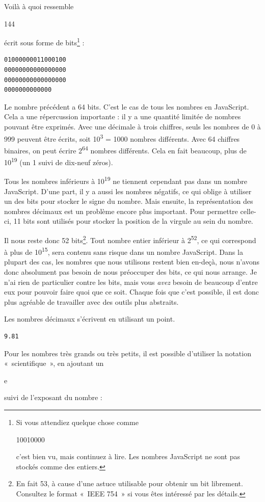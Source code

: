 \documentclass{FramateX}
\renewcommand{\texttt}[1]{\begin{sffamily}{#1}\end{sffamily}}
\begin{document}
Voilà à quoi ressemble \texttt{144} écrit sous forme de
bits\footnote{Si vous attendiez quelque chose comme \texttt{10010000} c'est bien vu, mais continuez à lire. Les nombres JavaScript ne sont pas stockés comme des entiers.} :

\begin{lstlisting}
01000000011000100
00000000000000000
00000000000000000
0000000000000
\end{lstlisting}
Le nombre précédent a 64 bits. C'est le cas de tous les nombres en
JavaScript. Cela a une répercussion importante : il y a une quantité
limitée de nombres pouvant être exprimés. Avec une décimale à trois
chiffres, seuls les nombres de 0 à 999 peuvent être écrits, soit
10\textsuperscript{3} = 1000 nombres différents. Avec 64 chiffres
binaires, on peut écrire 2\textsuperscript{64} nombres différents. Cela
en fait beaucoup, plus de 10\textsuperscript{19} (un 1 suivi de dix-neuf
zéros).

Tous les nombres inférieurs à 10\textsuperscript{19} ne tiennent
cependant pas dans un nombre JavaScript. D'une part, il y a aussi les
nombres négatifs, ce qui oblige à utiliser un des bits pour stocker le
signe du nombre. Mais ensuite, la représentation des nombres décimaux
est un problème encore plus important. Pour permettre celle-ci, 11 bits
sont utilisés pour stocker la position de la virgule au sein du nombre.

Il nous reste donc 52 bits\footnote{En fait 53, à cause d'une astuce utilisable pour obtenir un bit librement. Consultez le format «~IEEE 754~» si vous êtes intéressé par les détails.}. Tout nombre entier
inférieur à 2\textsuperscript{52}, ce qui correspond à plus de
10\textsuperscript{15}, sera contenu sans risque dans un nombre
JavaScript. Dans la plupart des cas, les nombres que nous utilisons
restent bien en-deçà, nous n'avons donc absolument pas besoin de nous
préoccuper des bits, ce qui nous arrange. Je n'ai rien de particulier
contre les bits, mais vous \emph{avez} besoin de beaucoup d'entre eux
pour pouvoir faire quoi que ce soit. Chaque fois que c'est possible, il
est donc plus agréable de travailler avec des outils plus abstraits.

Les nombres décimaux s'écrivent en utilisant un point.

\begin{lstlisting}
9.81
\end{lstlisting}
Pour les nombres très grands ou très petits, il est possible d'utiliser
la notation «~scientifique~», en ajoutant un \texttt{e} suivi de
l'exposant du nombre :
\end{document}
